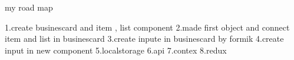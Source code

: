 my road map


1.create businescard and item , list component
2.made first object and connect item and list in businescard
3.create inpute in businescard by formik
4.create input in new component
5.localstorage
6.api
7.contex
8.redux